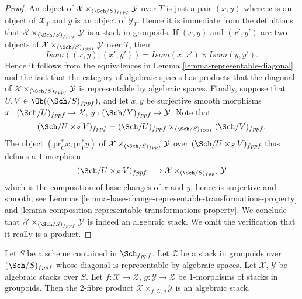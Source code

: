 \begin{proof}
An object of $\mathcal{X} \times_{(\Sch/S)_{fppf}} \mathcal{Y}$
over $T$ is just a pair $(x, y)$ where $x$ is an object of $\mathcal{X}_T$
and $y$ is an object of $\mathcal{Y}_T$. Hence it is immediate from
the definitions that
$\mathcal{X} \times_{(\Sch/S)_{fppf}} \mathcal{Y}$ is a
stack in groupoids. If $(x, y)$ and $(x', y')$ are
two objects of $\mathcal{X} \times_{(\Sch/S)_{fppf}} \mathcal{Y}$
over $T$, then
$$
\mathit{Isom}((x, y), (x', y')) =
\mathit{Isom}(x, x') \times \mathit{Isom}(y, y').
$$
Hence it follows from the equivalences in
Lemma \ref{lemma-representable-diagonal}
and the fact that the category of algebraic spaces has products
that the diagonal of $\mathcal{X} \times_{(\Sch/S)_{fppf}} \mathcal{Y}$
is representable by algebraic spaces.
Finally, suppose that $U, V \in \Ob((\Sch/S)_{fppf})$,
and let $x, y$ be surjective smooth morphisms
$x : (\Sch/U)_{fppf} \to \mathcal{X}$,
$y : (\Sch/Y)_{fppf} \to \mathcal{Y}$.
Note that
$$
(\Sch/U \times_S V)_{fppf} =
(\Sch/U)_{fppf}
\times_{(\Sch/S)_{fppf}} (\Sch/V)_{fppf}.
$$
The object $(\text{pr}_U^*x, \text{pr}_V^*y)$ of
$\mathcal{X} \times_{(\Sch/S)_{fppf}} \mathcal{Y}$ over
$(\Sch/U \times_S V)_{fppf}$ thus defines a $1$-morphism
$$
(\Sch/U \times_S V)_{fppf}
\longrightarrow
\mathcal{X} \times_{(\Sch/S)_{fppf}} \mathcal{Y}
$$
which is the composition of base changes of $x$ and $y$, hence
is surjective and smooth, see
Lemmas \ref{lemma-base-change-representable-transformations-property} and
\ref{lemma-composition-representable-transformations-property}.
We conclude that $\mathcal{X} \times_{(\Sch/S)_{fppf}} \mathcal{Y}$
is indeed an algebraic stack. We omit the verification that it
really is a product.
\end{proof}

\begin{lemma}
\label{lemma-2-fibre-product-general}
Let $S$ be a scheme contained in $\Sch_{fppf}$.
Let $\mathcal{Z}$ be a stack in groupoids over $(\Sch/S)_{fppf}$
whose diagonal is representable by algebraic spaces.
Let $\mathcal{X}$, $\mathcal{Y}$ be algebraic stacks over $S$.
Let $f : \mathcal{X} \to \mathcal{Z}$, $g : \mathcal{Y} \to \mathcal{Z}$
be $1$-morphisms of stacks in groupoids. Then the $2$-fibre product
$\mathcal{X} \times_{f, \mathcal{Z}, g} \mathcal{Y}$ is an algebraic stack.
\end{lemma}

